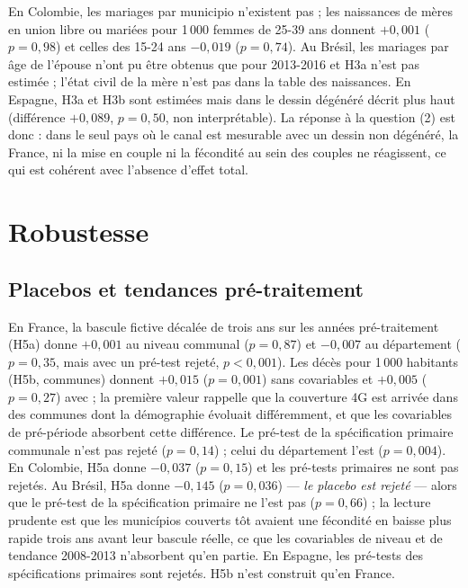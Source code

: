 \documentclass[11pt,a4paper]{article}
\begin{document}
En Colombie, les mariages par municipio n'existent pas ; les naissances de mères en union libre ou mariées pour 1\,000 femmes de 25-39 ans donnent $+0{,}001$ ($p = 0{,}98$) et celles des 15-24 ans $-0{,}019$ ($p = 0{,}74$). Au Brésil, les mariages par âge de l'épouse n'ont pu être obtenus que pour 2013-2016 et H3a n'est pas estimée ; l'état civil de la mère n'est pas dans la table des naissances. En Espagne, H3a et H3b sont estimées mais dans le dessin dégénéré décrit plus haut (différence $+0{,}089$, $p = 0{,}50$, non interprétable). La réponse à la question (2) est donc : dans le seul pays où le canal est mesurable avec un dessin non dégénéré, la France, ni la mise en couple ni la fécondité au sein des couples ne réagissent, ce qui est cohérent avec l'absence d'effet total.



\section{Robustesse}

\subsection{Placebos et tendances pré-traitement}

En France, la bascule fictive décalée de trois ans sur les années pré-traitement (H5a) donne $+0{,}001$ au niveau communal ($p = 0{,}87$) et $-0{,}007$ au département ($p = 0{,}35$, mais avec un pré-test rejeté, $p < 0{,}001$). Les décès pour 1\,000 habitants (H5b, communes) donnent $+0{,}015$ ($p = 0{,}001$) sans covariables et $+0{,}005$ ($p = 0{,}27$) avec ; la première valeur rappelle que la couverture 4G est arrivée dans des communes dont la démographie évoluait différemment, et que les covariables de pré-période absorbent cette différence. Le pré-test de la spécification primaire communale n'est pas rejeté ($p = 0{,}14$) ; celui du département l'est ($p = 0{,}004$). En Colombie, H5a donne $-0{,}037$ ($p = 0{,}15$) et les pré-tests primaires ne sont pas rejetés. Au Brésil, H5a donne $-0{,}145$ ($p = 0{,}036$) — \emph{le placebo est rejeté} — alors que le pré-test de la spécification primaire ne l'est pas ($p = 0{,}66$) ; la lecture prudente est que les municípios couverts tôt avaient une fécondité en baisse plus rapide trois ans avant leur bascule réelle, ce que les covariables de niveau et de tendance 2008-2013 n'absorbent qu'en partie. En Espagne, les pré-tests des spécifications primaires sont rejetés. H5b n'est construit qu'en France.
\end{document}
